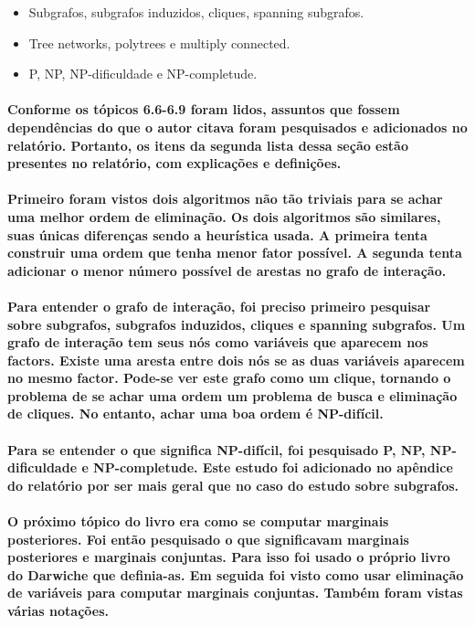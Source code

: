 \documentclass[a4paper,10pt]{article}
\theoremstyle{plain}
\begin{document}
\begin{itemize}
  \item Subgrafos, subgrafos induzidos, cliques, spanning subgrafos.
  \item Tree networks, polytrees e multiply connected.
  \item P, NP, NP-dificuldade e NP-completude.
\end{itemize}

\paragraph{
  Conforme os tópicos 6.6-6.9 foram lidos, assuntos que fossem dependências do que o autor citava
  foram pesquisados e adicionados no relatório. Portanto, os itens da segunda lista dessa seção
  estão presentes no relatório, com explicações e definições.
}

\paragraph{
  Primeiro foram vistos dois algoritmos não tão triviais para se achar uma melhor ordem de
  eliminação. Os dois algoritmos são similares, suas únicas diferenças sendo a heurística usada.
  A primeira tenta construir uma ordem que tenha menor fator possível. A segunda tenta adicionar
  o menor número possível de arestas no grafo de interação.
}

\paragraph{
  Para entender o grafo de interação, foi preciso primeiro pesquisar sobre subgrafos, subgrafos
  induzidos, cliques e spanning subgrafos. Um grafo de interação tem seus nós como variáveis que
  aparecem nos factors. Existe uma aresta entre dois nós se as duas variáveis aparecem no mesmo
  factor. Pode-se ver este grafo como um clique, tornando o problema de se achar uma ordem um
  problema de busca e eliminação de cliques. No entanto, achar uma boa ordem é NP-difícil.
}

\paragraph{
  Para se entender o que significa NP-difícil, foi pesquisado P, NP, NP-dificuldade e
  NP-completude. Este estudo foi adicionado no apêndice do relatório por ser mais geral que no caso
  do estudo sobre subgrafos.
}

\paragraph{
  O próximo tópico do livro era como se computar marginais posteriores. Foi então pesquisado o que
  significavam marginais posteriores e marginais conjuntas. Para isso foi usado o próprio livro do
  Darwiche\cite{bayes-net-darwiche} que definia-as. Em seguida foi visto como usar eliminação de
  variáveis para computar marginais conjuntas. Também foram vistas várias notações.
}
\end{document}
